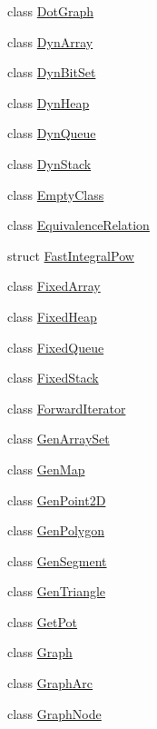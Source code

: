 \begin{DoxyCompactItemize}
\item 
class \hyperlink{class_designar_1_1_dot_graph}{Dot\+Graph}
\item 
class \hyperlink{class_designar_1_1_dyn_array}{Dyn\+Array}
\item 
class \hyperlink{class_designar_1_1_dyn_bit_set}{Dyn\+Bit\+Set}
\item 
class \hyperlink{class_designar_1_1_dyn_heap}{Dyn\+Heap}
\item 
class \hyperlink{class_designar_1_1_dyn_queue}{Dyn\+Queue}
\item 
class \hyperlink{class_designar_1_1_dyn_stack}{Dyn\+Stack}
\item 
class \hyperlink{class_designar_1_1_empty_class}{Empty\+Class}
\item 
class \hyperlink{class_designar_1_1_equivalence_relation}{Equivalence\+Relation}
\item 
struct \hyperlink{struct_designar_1_1_fast_integral_pow}{Fast\+Integral\+Pow}
\item 
class \hyperlink{class_designar_1_1_fixed_array}{Fixed\+Array}
\item 
class \hyperlink{class_designar_1_1_fixed_heap}{Fixed\+Heap}
\item 
class \hyperlink{class_designar_1_1_fixed_queue}{Fixed\+Queue}
\item 
class \hyperlink{class_designar_1_1_fixed_stack}{Fixed\+Stack}
\item 
class \hyperlink{class_designar_1_1_forward_iterator}{Forward\+Iterator}
\item 
class \hyperlink{class_designar_1_1_gen_array_set}{Gen\+Array\+Set}
\item 
class \hyperlink{class_designar_1_1_gen_map}{Gen\+Map}
\item 
class \hyperlink{class_designar_1_1_gen_point2_d}{Gen\+Point2D}
\item 
class \hyperlink{class_designar_1_1_gen_polygon}{Gen\+Polygon}
\item 
class \hyperlink{class_designar_1_1_gen_segment}{Gen\+Segment}
\item 
class \hyperlink{class_designar_1_1_gen_triangle}{Gen\+Triangle}
\item 
class \hyperlink{class_designar_1_1_get_pot}{Get\+Pot}
\item 
class \hyperlink{class_designar_1_1_graph}{Graph}
\item 
class \hyperlink{class_designar_1_1_graph_arc}{Graph\+Arc}
\item 
class \hyperlink{class_designar_1_1_graph_node}{Graph\+Node}

\end{DoxyCompactItemize}
